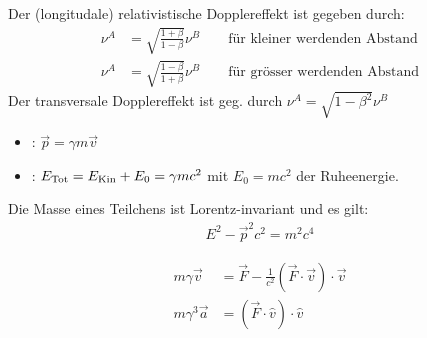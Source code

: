 \vspace{1\baselineskip}


Der (longitudale) relativistische Dopplereffekt ist gegeben durch:
\begin{align*}
    \nu^{A} &= \sqrt{\frac{1+\beta}{1-\beta}} \nu^{B}
    \quad \quad \text{für kleiner werdenden Abstand}
    \\
    \nu^{A} &= \sqrt{\frac{1-\beta}{1+\beta}} \nu^{B}
    \quad \quad \text{für grösser werdenden Abstand}
\end{align*}
Der transversale Dopplereffekt ist geg. durch $\nu^{A} = \sqrt{1-\beta^2} \nu^B$

\vspace{1\baselineskip}

\begin{itemize}
    \item {}: $\vec{p} = \gamma m \vec{v}$
    \item {}: $E_{\text{Tot}} = E_{\text{Kin}} + E_0 = \gamma m c^2$ mit $E_0 = mc^2$ der Ruheenergie.
\end{itemize}
Die Masse eines Teilchens ist Lorentz-invariant und es gilt:
\begin{align*}
    E^2 - \vec{p}^2 c^2 = m^2 c^4
\end{align*}

\vspace{1\baselineskip}

\begin{align*}
    m \gamma \vec{v} &= \vec{F} - \frac{1}{c^2} (\vec{F} \cdot \vec{v}) \cdot \vec{v}
    \\
    m \gamma^3 \vec{a} &= (\vec{F} \cdot \hat{v}) \cdot \hat{v}
\end{align*}

\vspace{1\baselineskip}


